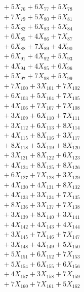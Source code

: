 \documentclass[a4paper,10pt]{article}
\begin{document}
{\begin{align}
&\;  + 5 X_{76} + 6 X_{77} + 5 X_{78} \\[0.3ex]
&\;  + 7 X_{79} + 5 X_{80} + 5 X_{81} \\[0.3ex]
&\;  + 5 X_{82} + 6 X_{83} + 5 X_{84} \\[0.3ex]
&\;  + 6 X_{85} + 4 X_{86} + 7 X_{87} \\[0.3ex]
&\;  + 6 X_{88} + 7 X_{89} + 4 X_{90} \\[0.3ex]
&\;  + 6 X_{91} + 4 X_{92} + 5 X_{93} \\[0.3ex]
&\;  + 4 X_{94} + 4 X_{95} + 6 X_{96} \\[0.3ex]
&\;  + 5 X_{97} + 7 X_{98} + 5 X_{99} \\[0.5ex]\allowbreak
&\;  + 7 X_{100} + 3 X_{101} + 7 X_{102} \\[0.3ex]
&\;  + 6 X_{103} + 5 X_{104} + 7 X_{105} \\[0.3ex]
&\;  + 4 X_{106} + 7 X_{107} + 7 X_{108} \\[0.3ex]
&\;  + 3 X_{109} + 6 X_{110} + 7 X_{111} \\[0.3ex]
&\;  + 3 X_{112} + 6 X_{113} + 8 X_{114} \\[0.3ex]
&\;  + 4 X_{115} + 8 X_{116} + 3 X_{117} \\[0.3ex]
&\;  + 8 X_{118} + 5 X_{119} + 8 X_{120} \\[0.3ex]
&\;  + 3 X_{121} + 8 X_{122} + 6 X_{123} \\[0.3ex]
&\;  + 4 X_{124} + 8 X_{125} + 8 X_{126} \\[0.3ex]
&\;  + 6 X_{127} + 7 X_{128} + 3 X_{129} \\[0.5ex]\allowbreak
&\;  + 4 X_{130} + 4 X_{131} + 8 X_{132} \\[0.3ex]
&\;  + 4 X_{133} + 3 X_{134} + 7 X_{135} \\[0.3ex]
&\;  + 8 X_{136} + 3 X_{137} + 7 X_{138} \\[0.3ex]
&\;  + 3 X_{139} + 8 X_{140} + 3 X_{141} \\[0.3ex]
&\;  + 4 X_{142} + 4 X_{143} + 4 X_{144} \\[0.3ex]
&\;  + 3 X_{145} + 7 X_{146} + 7 X_{147} \\[0.3ex]
&\;  + 3 X_{148} + 4 X_{149} + 5 X_{150} \\[0.3ex]
&\;  + 5 X_{151} + 6 X_{152} + 7 X_{153} \\[0.3ex]
&\;  + 5 X_{154} + 6 X_{155} + 6 X_{156} \\[0.3ex]
&\;  + 4 X_{157} + 3 X_{158} + 7 X_{159} \\[0.5ex]\allowbreak
&\;  + 7 X_{160} + 7 X_{161} + 5 X_{162} \\[0.3ex]

\end{align}}
\end{document}
